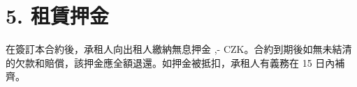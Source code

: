 \section*{5. 租賃押金}
在簽訂本合約後，承租人向出租人繳納無息押金 \DepositAmount,- CZK。合約到期後如無未結清的欠款和賠償，該押金應全額退還。如押金被抵扣，承租人有義務在 15 日內補齊。

